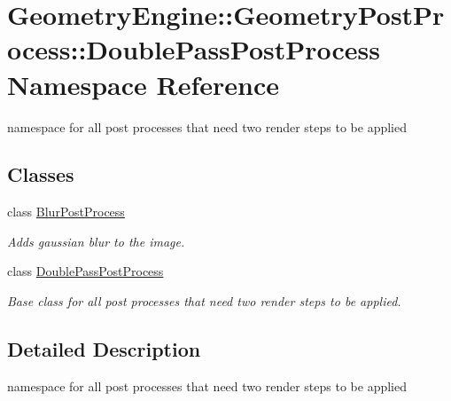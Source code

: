 \hypertarget{namespace_geometry_engine_1_1_geometry_post_process_1_1_double_pass_post_process}{}\section{Geometry\+Engine\+::Geometry\+Post\+Process\+::Double\+Pass\+Post\+Process Namespace Reference}
\label{namespace_geometry_engine_1_1_geometry_post_process_1_1_double_pass_post_process}


namespace for all post processes that need two render steps to be applied  


\subsection*{Classes}
\begin{DoxyCompactItemize}
\item 
class \mbox{\hyperlink{class_geometry_engine_1_1_geometry_post_process_1_1_double_pass_post_process_1_1_blur_post_process}{Blur\+Post\+Process}}
\begin{DoxyCompactList}\small\item\em Adds gaussian blur to the image. \end{DoxyCompactList}\item 
class \mbox{\hyperlink{class_geometry_engine_1_1_geometry_post_process_1_1_double_pass_post_process_1_1_double_pass_post_process}{Double\+Pass\+Post\+Process}}
\begin{DoxyCompactList}\small\item\em Base class for all post processes that need two render steps to be applied. \end{DoxyCompactList}\end{DoxyCompactItemize}


\subsection{Detailed Description}
namespace for all post processes that need two render steps to be applied 